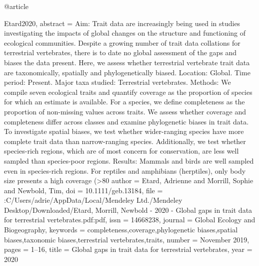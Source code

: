 
@article{Etard2020,
abstract = {Aim: Trait data are increasingly being used in studies investigating the impacts of global changes on the structure and functioning of ecological communities. Despite a growing number of trait data collations for terrestrial vertebrates, there is to date no global assessment of the gaps and biases the data present. Here, we assess whether terrestrial vertebrate trait data are taxonomically, spatially and phylogenetically biased. Location: Global. Time period: Present. Major taxa studied: Terrestrial vertebrates. Methods: We compile seven ecological traits and quantify coverage as the proportion of species for which an estimate is available. For a species, we define completeness as the proportion of non-missing values across traits. We assess whether coverage and completeness differ across classes and examine phylogenetic biases in trait data. To investigate spatial biases, we test whether wider-ranging species have more complete trait data than narrow-ranging species. Additionally, we test whether species-rich regions, which are of most concern for conservation, are less well sampled than species-poor regions. Results: Mammals and birds are well sampled even in species-rich regions. For reptiles and amphibians (herptiles), only body size presents a high coverage (>80%
author = {Etard, Adrienne and Morrill, Sophie and Newbold, Tim},
doi = {10.1111/geb.13184},
file = {:C\:/Users/adrie/AppData/Local/Mendeley Ltd./Mendeley Desktop/Downloaded/Etard, Morrill, Newbold - 2020 - Global gaps in trait data for terrestrial vertebrates.pdf:pdf},
issn = {14668238},
journal = {Global Ecology and Biogeography},
keywords = {completeness,coverage,phylogenetic biases,spatial biases,taxonomic biases,terrestrial vertebrates,traits},
number = {November 2019},
pages = {1--16},
title = {{Global gaps in trait data for terrestrial vertebrates}},
year = {2020}
}

}
